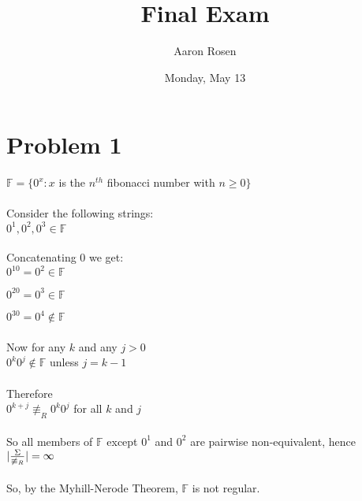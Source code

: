 \documentclass[12pt]{article}
\begin{document}
\title{Final Exam}
\author{Aaron Rosen}
\date{Monday, May 13}
\maketitle

\section*{Problem 1}
$\mathbb{F} = \{0^x : x$ is the $n^{th}$ fibonacci number with $n \geq 0 \}$\\
\\
Consider the following strings: \\

$0^1, 0^2, 0^3 \in \mathbb{F}$\\
\\
Concatenating $0$ we get: \\

$0^10 = 0^2 \in \mathbb{F}$

$0^20 = 0^3 \in \mathbb{F}$

$0^30 = 0^4 \notin \mathbb{F}$\\
\\
Now for any $k$ and any $j > 0$\\

$0^k 0^j \notin \mathbb{F}$ unless $j=k-1$\\
\\
Therefore\\

$0^{k+j} \not \equiv _{R} 0^k 0^j$ for all $k$ and $j$\\
\\
So all members of $\mathbb{F}$ except $0^1$ and $0^2$ are pairwise non-equivalent,
hence\\

$\lvert \nicefrac{\Sigma}{\not \equiv _R} \rvert = \infty$\\
\\
So, by the Myhill-Nerode Theorem, $\mathbb{F}$ is not regular.
\end{document}
